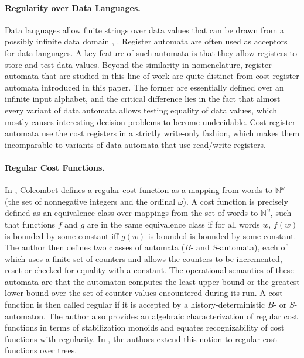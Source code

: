 \documentclass[11pt]{article}
\begin{document}
\paragraph{Regularity over Data Languages.} Data languages allow
finite strings over data values that can be drawn from a possibly
infinite data domain \cite{neven_finite_2004},
\cite{kaminski_finite_1994} \cite{bjorklund_notions_2010}. Register
automata are often used as acceptors for data languages. A key feature
of such automata is that they allow registers to store and test data
values.  Beyond the similarity in nomenclature, register automata that
are studied in this line of work are quite distinct from cost register
automata introduced in this paper. The former are essentially defined
over an infinite input alphabet, and the critical difference lies in
the fact that almost every variant of data automata allows testing
equality of data values, which mostly causes interesting decision
problems to become undecidable. Cost register automata use the cost
registers in a strictly write-only fashion, which makes them
incomparable to variants of data automata that use read/write
registers.



\paragraph{Regular Cost Functions.}
In \cite{colcombet_theory_2009}, Colcombet defines a regular cost
function as a mapping from words to $\mathbb{N}^\omega$ (the set of
nonnegative integers and the ordinal $\omega$). A cost function is
precisely defined as an equivalence class over mappings from the set
of words to $\mathbb{N}^\omega$, such that functions $f$ and $g$ are
in the same equivalence class if for all words $w$, $f(w)$ is bounded
by some constant iff $g(w)$ is bounded is bounded by some constant.
The author then defines two classes of automata ($B$- and
$S$-automata), each of which uses a finite set of counters and allows
the counters to be incremented, reset or checked for equality with a
constant. The operational semantics of these automata are that the
automaton computes the least upper bound or the greatest lower bound
over the set of counter values encountered during its run. A cost
function is then called regular if it is accepted by a
history-deterministic $B$- or $S$-automaton.  The author also provides
an algebraic characterization of regular cost functions in terms of
stabilization monoids and equates recognizability of cost functions
with regularity. In \cite{colcombet_regular_2010}, the authors extend
this notion to regular cost functions over trees.
\end{document}
